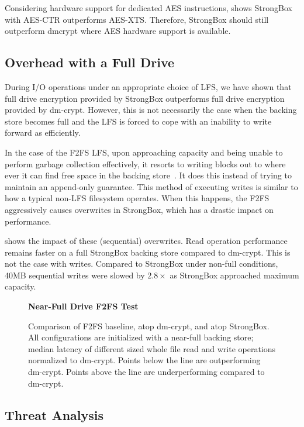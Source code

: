 Considering hardware support for dedicated AES instructions,
 shows StrongBox with AES-CTR outperforms
AES-XTS. Therefore, StrongBox should still outperform dmcrypt where AES hardware
support is available.

\subsection{Overhead with a Full Drive}
During I/O operations under an appropriate choice of LFS, we have shown that
full drive encryption provided by StrongBox outperforms full drive encryption
provided by dm-crypt. However, this is not necessarily the case when the backing
store becomes full and the LFS is forced to cope with an inability to write
forward as efficiently.

In the case of the F2FS LFS, upon approaching capacity and being unable to
perform garbage collection effectively, it resorts to writing blocks out to
where ever it can find free space in the backing store~\cite{F2FS}. It does this
instead of trying to maintain an append-only guarantee. This method of executing
writes is similar to how a typical non-LFS filesystem operates. When this
happens, the F2FS aggressively causes overwrites in StrongBox, which has a
drastic impact on performance.

 shows the impact of these (sequential) overwrites.
Read operation performance remains faster on a full StrongBox backing store
compared to dm-crypt. This is not the case with writes. Compared to StrongBox
under non-full conditions, 40MB sequential writes were slowed by $2.8\times$ as
StrongBox approached maximum capacity.

\begin{figure}[ht]
    \textbf{Near-Full Drive F2FS Test}\par\medskip
    \centering
    {}
    \caption{Comparison of F2FS baseline, atop dm-crypt, and atop
      StrongBox. All configurations are initialized with a near-full
      backing store; median latency of different sized whole file read
      and write operations normalized to dm-crypt. Points below the
      line are outperforming dm-crypt. Points above the line are
      underperforming compared to dm-crypt.}
   \label{fig:microbench-f2fs-full}
\end{figure}

\subsection{Threat Analysis}


